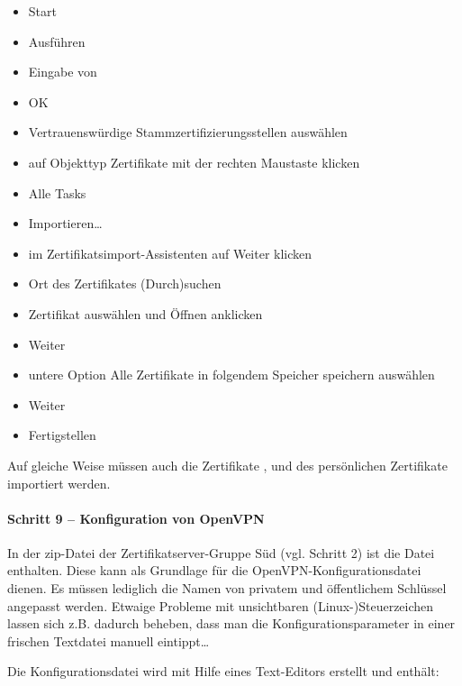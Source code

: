 \begin{itemize}
  \item \glqq{}Start\grqq{}
  \item \glqq{}Ausführen\grqq{}
  \item Eingabe von 
  \item \glqq{}OK\grqq{}
  \item \glqq{}Vertrauenswürdige Stammzertifizierungsstellen\grqq{} auswählen
  \item auf Objekttyp \glqq{}Zertifikate\grqq{} mit der rechten Maustaste klicken
  \item \glqq{}Alle Tasks\grqq{}
  \item \glqq{}Importieren\ldots\grqq{} 
  \item im Zertifikatsimport-Assistenten auf \glqq{}Weiter\grqq{} klicken
  \item Ort des Zertifikates \glqq{}(Durch)suchen\grqq{}
  \item Zertifikat auswählen und \glqq{}Öffnen\grqq{} anklicken
  \item \glqq{}Weiter\grqq{}
  \item untere Option \glqq{}Alle Zertifikate in folgendem Speicher speichern\grqq{} auswählen
  \item \glqq{}Weiter\grqq{}
  \item \glqq{}Fertigstellen\grqq{}
\end{itemize}

Auf gleiche Weise müssen auch die Zertifikate
,  und des
persönlichen Zertifikate  importiert
werden.

\paragraph{Schritt 9 -- Konfiguration von OpenVPN}

In der zip-Datei der Zertifikatserver-Gruppe Süd (vgl. Schritt 2) ist die Datei
 enthalten. Diese kann als Grundlage für die
OpenVPN\hyp Konfigurationsdatei dienen. Es müssen lediglich die Namen von privatem
und öffentlichem Schlüssel angepasst werden. Etwaige Probleme mit unsichtbaren
(Linux-)Steuerzeichen lassen sich z.B. dadurch beheben, dass man die
Konfigurationsparameter in einer \glqq{}frischen\grqq{} Textdatei manuell eintippt\ldots

Die Konfigurationsdatei  wird mit Hilfe eines
Text-Editors erstellt und enthält:

